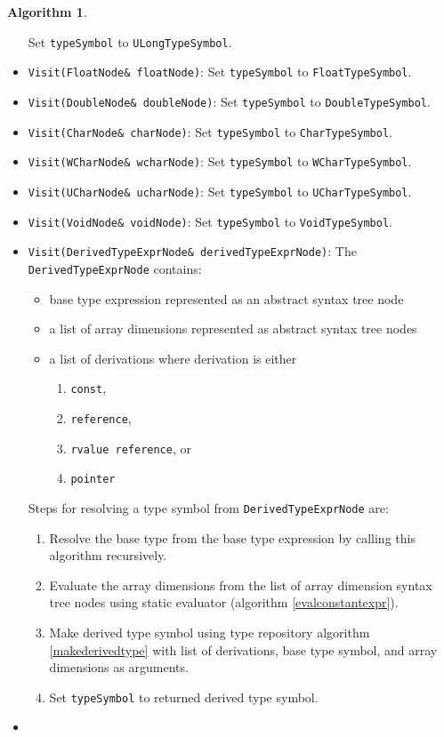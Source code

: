 \documentclass[a4paper,oneside,11pt]{book}
\theoremstyle{definition}
\newtheorem{algo}{Algorithm}[section]
\begin{document}
\begin{algo}
\begin{itemize}
Set \verb|typeSymbol| to \verb|ULongTypeSymbol|.
\item
\verb|Visit(FloatNode& floatNode)|:
Set \verb|typeSymbol| to \verb|FloatTypeSymbol|.
\item
\verb|Visit(DoubleNode& doubleNode)|:
Set \verb|typeSymbol| to \verb|DoubleTypeSymbol|.
\item
\verb|Visit(CharNode& charNode)|:
Set \verb|typeSymbol| to \verb|CharTypeSymbol|.
\item
\verb|Visit(WCharNode& wcharNode)|:
Set \verb|typeSymbol| to \verb|WCharTypeSymbol|.
\item
\verb|Visit(UCharNode& ucharNode)|:
Set \verb|typeSymbol| to \verb|UCharTypeSymbol|.
\item
\verb|Visit(VoidNode& voidNode)|:
Set \verb|typeSymbol| to \verb|VoidTypeSymbol|.
\item
\verb|Visit(DerivedTypeExprNode& derivedTypeExprNode)|:
The \verb|DerivedTypeExprNode| contains:
\begin{itemize}
\item
base type expression represented as an abstract syntax tree node
\item
a list of array dimensions represented as abstract syntax tree nodes
\item
a list of derivations where derivation is either
\begin{enumerate}
\item
\verb|const|,
\item
\verb|reference|,
\item
\verb|rvalue reference|, or
\item
\verb|pointer|
\end{enumerate}
\end{itemize}
Steps for resolving a type symbol from \verb|DerivedTypeExprNode| are:
\begin{enumerate}
\item
Resolve the base type from the base type expression by calling this algorithm recursively.
\item
Evaluate the array dimensions from the list of array dimension syntax tree nodes using static evaluator (algorithm \ref{evalconstantexpr}).
\item
Make derived type symbol using type repository algorithm \ref{makederivedtype} with list of derivations, base type symbol, and array dimensions as arguments.
\item
Set \verb|typeSymbol| to returned derived type symbol.
\end{enumerate}
\item

\end{itemize}
\end{algo}
\end{document}
